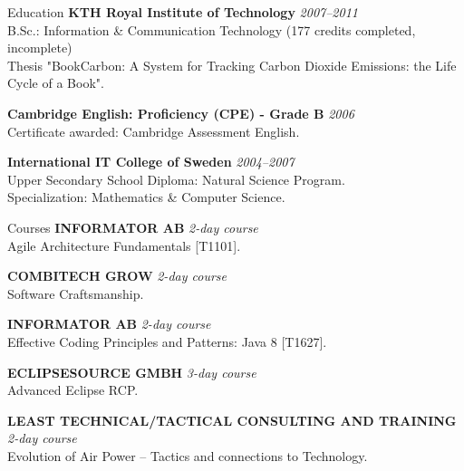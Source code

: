 \documentclass{resume}
\begin{document}
  \begin{rSection}{Education}
  {\bf KTH Royal Institute of Technology}
    \hfill {\em 2007--2011 } \\
    { B.Sc.: Information \& Communication Technology (177 credits completed, incomplete) } \\
    { Thesis "BookCarbon: A System for Tracking Carbon Dioxide Emissions: the Life Cycle of a Book". }

    {\bf Cambridge English: Proficiency (CPE) - Grade B}
    \hfill {\em 2006 } \\
    { Certificate awarded: Cambridge Assessment English. }

    {\bf International IT College of Sweden}
    \hfill {\em 2004--2007 } \\
    { Upper Secondary School Diploma: Natural Science Program. } \\
    { Specialization: Mathematics \& Computer Science. }
  \end{rSection}

  \begin{rSection}{Courses}
  {\bf INFORMATOR AB}
    \hfill {\em 2-day course } \\
    { Agile Architecture Fundamentals [T1101]. } %

    {\bf COMBITECH GROW}
    \hfill {\em 2-day course } \\
    { Software Craftsmanship. } %

    {\bf INFORMATOR AB}
    \hfill {\em 2-day course } \\
    { Effective Coding Principles and Patterns: Java 8 [T1627]. } %

    {\bf ECLIPSESOURCE GMBH}
    \hfill {\em 3-day course } \\
    { Advanced Eclipse RCP. } %

    {\bf LEAST TECHNICAL/TACTICAL CONSULTING AND TRAINING}
    \hfill {\em 2-day course } \\
    { Evolution of Air Power – Tactics and connections to Technology. } %
  \end{rSection}
\end{document}
